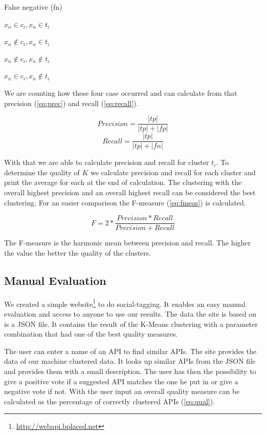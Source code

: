 \documentclass[a4paper]{IEEEtran}
\begin{document}
\begin{labeling}{False negative (fn)}
\centering \item  [True positive (tp)] $x_n \in c_i,x_n \in t_i$
\item [False positive (fp)] $x_n \notin c_i,x_n \in t_i$
\item [True negative (tn)] $x_n \notin c_i,x_n \notin t_i$
\item [False negative (fn)] $x_n \in c_i,x_n \notin t_i$
\end{labeling}

\vspace{2mm}
We are counting how these four case occurred and can calculate from that precision (\ref{eq:prec}) and recall (\ref{eq:recall}). 

\begin{equation}
\label{eq:prec}
Precision= \frac{|tp|}{|tp|+|fp|}
\end{equation}
\begin{equation}
\label{eq:recall}
Recall= \frac{|tp|}{|tp|+|fn|}
\end{equation}

With that we are able to calculate precision and recall for cluster $t_i$. To determine the quality of $K$ we calculate precision and recall for each cluster and print the average for each at the end of calculation. The clustering with the overall highest precision and an overall highest recall can be considered the best clustering. For an easier comparison the F-measure (\ref{eq:fmeas}) is calculated. 

\begin{equation}
\label{eq:fmeas}
F=2* \frac{Precision*Recall}{Precision+Recall}
\end{equation}

The F-measure is the harmonic mean between precision and recall. The higher the value the better the quality of the clusters.

\subsection{Manual Evaluation}
We created a simple website\footnote{\url{http://webapi.bplaced.net}} to do social-tagging. It enables an easy manual evaluation and access to anyone to use our results. The data the site is based on is a JSON file. It contains the result of the K-Means clustering with a parameter combination that had one of the best quality measures.

The user can enter a name of an API to find similar APIs. The site provides the data of our machine clustered data. It looks up similar APIs from the JSON file and provides them with a small description. The user has then the possibility to give a positive vote if a suggested API matches the one he put in or give a negative vote if not.
With the user input an overall quality measure can be calculated as the percentage of correctly clustered APIs (\ref{eq:qual}).
\end{document}
